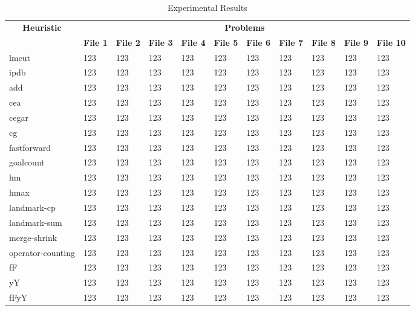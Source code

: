 \begin{table*}[ht]
    \centering
    \caption{Experimental Results}
    \label{tab:experimental_results}
    \begin{tabular}{p{3cm} *{10}{p{1cm}}}
        \toprule
        \multicolumn{1}{c}{\textbf{Heuristic}} & \multicolumn{10}{c}{\textbf{Problems}} \\
        \cmidrule(lr){2-11}
        & \textbf{File 1} & \textbf{File 2} & \textbf{File 3} & \textbf{File 4} & \textbf{File 5} & \textbf{File 6} & \textbf{File 7} & \textbf{File 8} & \textbf{File 9} & \textbf{File 10} \\
        \midrule
        lmcut & 123 & 123 & 123 & 123 & 123 & 123 & 123 & 123 & 123 & 123 \\
        ipdb & 123 & 123 & 123 & 123 & 123 & 123 & 123 & 123 & 123 & 123 \\
        add & 123 & 123 & 123 & 123 & 123 & 123 & 123 & 123 & 123 & 123 \\
        cea & 123 & 123 & 123 & 123 & 123 & 123 & 123 & 123 & 123 & 123 \\
        cegar & 123 & 123 & 123 & 123 & 123 & 123 & 123 & 123 & 123 & 123 \\
        cg & 123 & 123 & 123 & 123 & 123 & 123 & 123 & 123 & 123 & 123 \\
        fastforward & 123 & 123 & 123 & 123 & 123 & 123 & 123 & 123 & 123 & 123 \\
        goalcount & 123 & 123 & 123 & 123 & 123 & 123 & 123 & 123 & 123 & 123 \\
        hm & 123 & 123 & 123 & 123 & 123 & 123 & 123 & 123 & 123 & 123 \\
        hmax & 123 & 123 & 123 & 123 & 123 & 123 & 123 & 123 & 123 & 123 \\
        landmark-cp & 123 & 123 & 123 & 123 & 123 & 123 & 123 & 123 & 123 & 123 \\
        landmark-sum & 123 & 123 & 123 & 123 & 123 & 123 & 123 & 123 & 123 & 123 \\
        merge-shrink & 123 & 123 & 123 & 123 & 123 & 123 & 123 & 123 & 123 & 123 \\
        operator-counting & 123 & 123 & 123 & 123 & 123 & 123 & 123 & 123 & 123 & 123 \\
        fF & 123 & 123 & 123 & 123 & 123 & 123 & 123 & 123 & 123 & 123 \\
        yY & 123 & 123 & 123 & 123 & 123 & 123 & 123 & 123 & 123 & 123 \\
        fFyY & 123 & 123 & 123 & 123 & 123 & 123 & 123 & 123 & 123 & 123 \\
        \bottomrule
    \end{tabular}
\end{table*}



